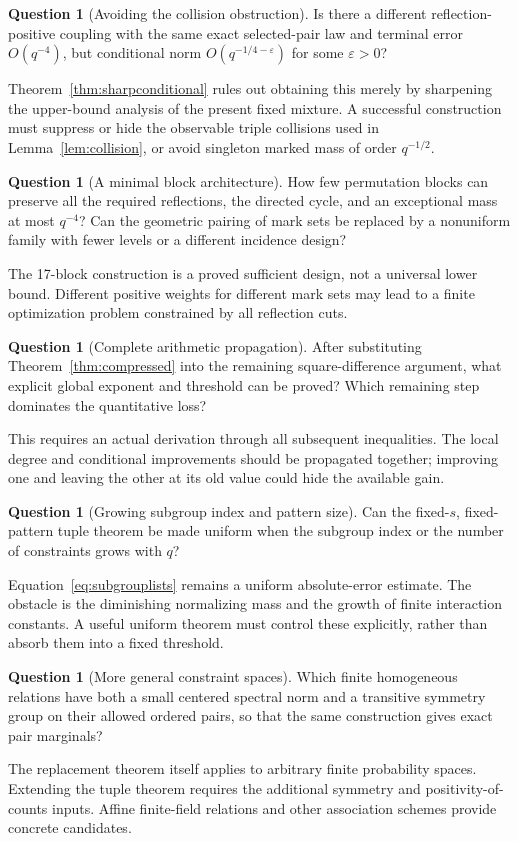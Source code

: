 \documentclass[11pt,a4paper]{article}
\numberwithin{equation}{section}
\theoremstyle{definition}
\newtheorem{question}[theorem]{Question}
\theoremstyle{remark}
\begin{document}
\begin{question}[Avoiding the collision obstruction]
Is there a different reflection-positive coupling with the same exact
selected-pair law and terminal error $O(q^{-4})$, but conditional norm
$O(q^{-1/4-\varepsilon})$ for some $\varepsilon>0$?
\end{question}
Theorem~\ref{thm:sharpconditional} rules out obtaining this merely by
sharpening the upper-bound analysis of the present fixed mixture.
A successful construction must suppress or hide the observable triple
collisions used in Lemma~\ref{lem:collision}, or avoid singleton marked
mass of order $q^{-1/2}$.

\begin{question}[A minimal block architecture]
How few permutation blocks can preserve all the required reflections,
the directed cycle, and an exceptional mass at most $q^{-4}$?
Can the geometric pairing of mark sets be replaced by a nonuniform
family with fewer levels or a different incidence design?
\end{question}
The 17-block construction is a proved sufficient design, not a universal
lower bound. Different positive weights for different mark sets may
lead to a finite optimization problem constrained by all reflection cuts.

\begin{question}[Complete arithmetic propagation]
After substituting Theorem~\ref{thm:compressed} into the remaining
square-difference argument, what explicit global exponent and threshold
can be proved? Which remaining step dominates the quantitative loss?
\end{question}
This requires an actual derivation through all subsequent inequalities.
The local degree and conditional improvements should be propagated
together; improving one and leaving the other at its old value could
hide the available gain.

\begin{question}[Growing subgroup index and pattern size]
Can the fixed-$s$, fixed-pattern tuple theorem be made uniform when the
subgroup index or the number of constraints grows with $q$?
\end{question}
Equation~\eqref{eq:subgrouplists} remains a uniform absolute-error
estimate. The obstacle is the diminishing normalizing mass and the
growth of finite interaction constants. A useful uniform theorem must
control these explicitly, rather than absorb them into a fixed threshold.

\begin{question}[More general constraint spaces]
Which finite homogeneous relations have both a small centered spectral
norm and a transitive symmetry group on their allowed ordered pairs,
so that the same construction gives exact pair marginals?
\end{question}
The replacement theorem itself applies to arbitrary finite probability
spaces. Extending the tuple theorem requires the additional symmetry
and positivity-of-counts inputs. Affine finite-field relations and
other association schemes provide concrete candidates.
\end{document}
